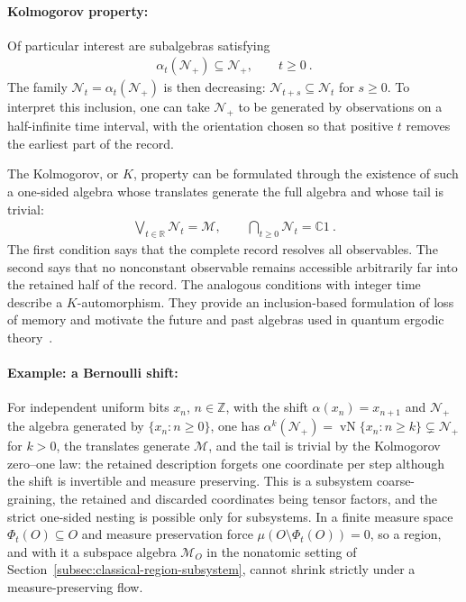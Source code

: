 \documentclass[a4paper,11pt]{article}
\theoremstyle{definition}
\begin{document}


\paragraph{Kolmogorov property:}
Of particular interest are subalgebras satisfying
\begin{align}\label{eq:classical-one-sided-inclusion}
    \alpha_t(\mathcal N_+)\subseteq\mathcal N_+,\qquad t\geq0\ .
\end{align}
The family $\mathcal N_t=\alpha_t(\mathcal N_+)$ is then decreasing: $\mathcal N_{t+s}\subseteq\mathcal N_t$ for $s\geq0$. To interpret this inclusion, one can take $\mathcal N_+$ to be generated by observations on a half-infinite time interval, with the orientation chosen so that positive $t$ removes the earliest part of the record.

The Kolmogorov, or $K$, property can be formulated through the existence of such a one-sided algebra whose translates generate the full algebra and whose tail is trivial:
\begin{align}\label{eq:classical-K-algebra}
    \bigvee_{t\in\mathbb R}\mathcal N_t=\mathcal M,
    \qquad
    \bigcap_{t\geq0}\mathcal N_t=\mathbb C1\ .
\end{align}
The first condition says that the complete record resolves all observables. The second says that no nonconstant observable remains accessible arbitrarily far into the retained half of the record. The analogous conditions with integer time describe a $K$-automorphism. They provide an inclusion-based formulation of loss of memory and motivate the future and past algebras used in quantum ergodic theory~\cite{ouseph2024local}.

\paragraph{Example: a Bernoulli shift:}
For independent uniform bits $x_n$, $n\in\mathbb Z$, with the shift $\alpha(x_n)=x_{n+1}$ and $\mathcal N_+$ the algebra generated by $\{x_n:n\geq0\}$, one has $\alpha^k(\mathcal N_+)=\operatorname{vN}\{x_n:n\geq k\}\subsetneq\mathcal N_+$ for $k>0$, the translates generate $\mathcal M$, and the tail is trivial by the Kolmogorov zero--one law: the retained description forgets one coordinate per step although the shift is invertible and measure preserving. This is a subsystem coarse-graining, the retained and discarded coordinates being tensor factors, and the strict one-sided nesting is possible only for subsystems. In a finite measure space $\Phi_t(O)\subseteq O$ and measure preservation force $\mu(O\setminus\Phi_t(O))=0$, so a region, and with it a subspace algebra $\mathcal M_O$ in the nonatomic setting of Section~\ref{subsec:classical-region-subsystem}, cannot shrink strictly under a measure-preserving flow.
\end{document}
